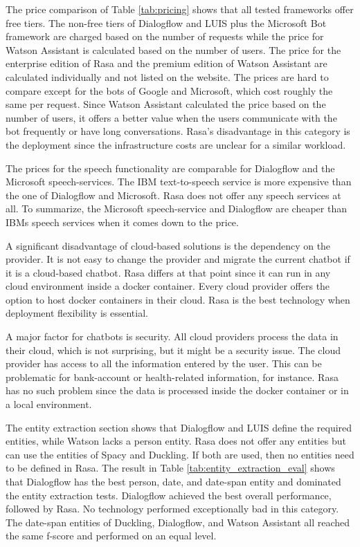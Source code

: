 The price comparison of Table \ref{tab:pricing} shows that all 
tested frameworks offer free tiers.
The non-free tiers of Dialogflow and LUIS plus the Microsoft Bot framework are charged based on the number of requests while the price for Watson Assistant is calculated based on the number of users.
The price for the enterprise edition of Rasa and the premium edition of Watson Assistant are calculated individually and not listed on the website.
The prices are hard to compare except for the bots of Google and Microsoft, which cost roughly the same per request. 
Since Watson Assistant calculated the price based on the number of users, it offers a better value when the users communicate with the bot frequently or have long conversations.
Rasa's disadvantage in this category is the deployment since the infrastructure costs are unclear for a similar workload.

The prices for the speech functionality are comparable for Dialogflow and the Microsoft speech-services.
The IBM text-to-speech service is more expensive than the one of Dialogflow and Microsoft.
Rasa does not offer any speech services at all.
To summarize, the Microsoft speech-service and Dialogflow are cheaper than IBMs speech services when it comes down to the price. 

A significant disadvantage of cloud-based solutions is the dependency on the provider.
It is not easy to change the provider and migrate the current chatbot if it is a cloud-based chatbot. 
Rasa differs at that point since it can run in any cloud environment inside a docker container.
Every cloud provider offers the option to host docker containers in their cloud.
Rasa is the best technology when deployment flexibility is essential.

A major factor for chatbots is security.
All cloud providers process the data in their cloud, which is not surprising, but it might be a security issue.
The cloud provider has access to all the information entered by the user.
This can be problematic for bank-account or health-related information, for instance.
Rasa has no such problem since the data is processed inside the docker container or in a local environment.

The entity extraction section shows that Dialogflow and LUIS 
define the required entities, while Watson lacks a person entity.
Rasa does not offer any entities but can use the entities of 
Spacy and Duckling.
If both are used, then no entities need to be defined in Rasa.
The result in Table \ref{tab:entity_extraction_eval} shows that 
Dialogflow has the best person, date, and date-span entity and dominated the entity extraction tests.
Dialogflow achieved the best overall performance, followed by Rasa.
No technology performed exceptionally bad in this category. 
The date-span entities of Duckling, Dialogflow, and Watson Assistant all reached the same f-score and performed on an equal level.

